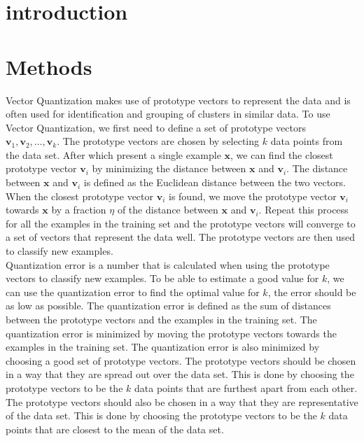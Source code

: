 \documentclass[twoside, a4paper, fleqn, reqno]{article}
\begin{document}
\maketitle

\section{introduction}

\section{Methods}

Vector Quantization makes use of prototype vectors to represent the data and is often used for identification and grouping of clusters in similar data.
To use Vector Quantization, we first need to define a set of prototype vectors $\mathbf{v}_1, \mathbf{v}_2, \ldots, \mathbf{v}_k$.
The prototype vectors are chosen by selecting $k$ data points from the data set.
After which present a single example $\mathbf{x}$, we can find the closest prototype vector $\mathbf{v}_i$ by minimizing the distance between $\mathbf{x}$ and $\mathbf{v}_i$.
The distance between $\mathbf{x}$ and $\mathbf{v}_i$ is defined as the Euclidean distance between the two vectors.
When the closest prototype vector $\mathbf{v}_i$ is found, we move the prototype vector $\mathbf{v}_i$ towards $\mathbf{x}$ by a fraction $\eta$ of the distance between $\mathbf{x}$ and $\mathbf{v}_i$.
Repeat this process for all the examples in the training set and the prototype vectors will converge to a set of vectors that represent the data well.
The prototype vectors are then used to classify new examples. \\

Quantization error is a number that is calculated when using the prototype vectors to classify new examples.
To be able to estimate a good value for $k$, we can use the quantization error to find the optimal value for $k$, the error should be as low as possible.
The quantization error is defined as the sum of distances between the prototype vectors and the examples in the training set.
The quantization error is minimized by moving the prototype vectors towards the examples in the training set.
The quantization error is also minimized by choosing a good set of prototype vectors.
The prototype vectors should be chosen in a way that they are spread out over the data set.
This is done by choosing the prototype vectors to be the $k$ data points that are furthest apart from each other.
The prototype vectors should also be chosen in a way that they are representative of the data set.
This is done by choosing the prototype vectors to be the $k$ data points that are closest to the mean of the data set.
\end{document}
